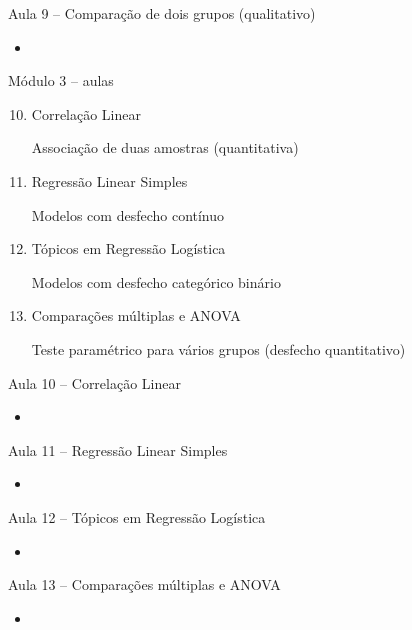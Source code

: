 \documentclass{beamer}
\begin{document}
\begin{frame}{\scriptsize Aula 9 -- Comparação de dois grupos (qualitativo)}
  \begin{itemize}
  \item 
  \end{itemize}
\end{frame}

\begin{frame}{\scriptsize Módulo 3 -- aulas}
  \begin{enumerate}
    \setcounter{enumi}{9}
  \item Correlação Linear

    {\tiny Associação de duas amostras (quantitativa)}
    \bigskip
  \item Regressão Linear Simples

    {\tiny Modelos com desfecho contínuo}
    \bigskip
  \item Tópicos em Regressão Logística

    {\tiny Modelos com desfecho categórico binário}
    \bigskip
  \item Comparações múltiplas e ANOVA

    {\tiny Teste paramétrico para vários grupos (desfecho quantitativo)}
  \end{enumerate}
\end{frame}

\begin{frame}{\scriptsize Aula 10 -- Correlação Linear}
  \begin{itemize}
  \item 
  \end{itemize}
\end{frame}

\begin{frame}{\scriptsize Aula 11 -- Regressão Linear Simples}
  \begin{itemize}
  \item 
  \end{itemize}
\end{frame}

\begin{frame}{\scriptsize Aula 12 -- Tópicos em Regressão Logística}
  \begin{itemize}
  \item 
  \end{itemize}
\end{frame}

\begin{frame}{\scriptsize Aula 13 -- Comparações múltiplas e ANOVA}
  \begin{itemize}
  \item 
  \end{itemize}
\end{frame}
\end{document}
